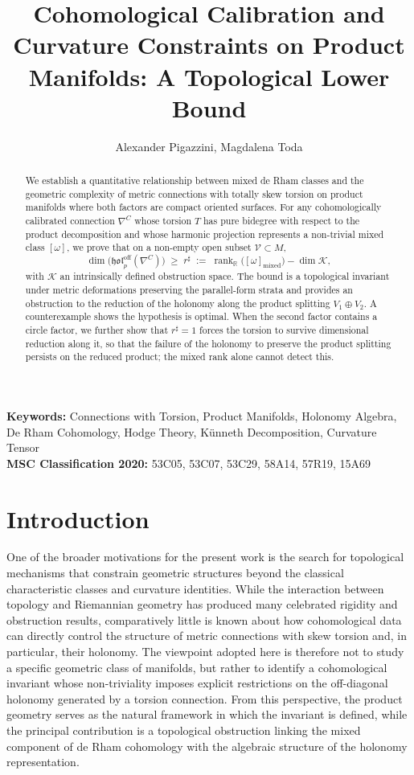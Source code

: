 \documentclass[11pt,reqno]{amsart}
\title[Cohomological Calibration and Curvature Constraints]{Cohomological Calibration and Curvature Constraints on Product Manifolds: A Topological Lower Bound}
\author{Alexander Pigazzini, Magdalena Toda}
\date{}
\theoremstyle{plain}
\theoremstyle{definition}
\numberwithin{equation}{section}
\begin{document}
\begin{abstract}

We establish a quantitative relationship between mixed de Rham classes and the geometric complexity of metric connections with totally skew torsion on product manifolds where both factors are compact oriented surfaces. For any cohomologically calibrated connection $\nabla^C$ whose torsion $T$ has pure bidegree with respect to the product decomposition and whose harmonic projection represents a non-trivial mixed class $[\omega]$, we prove that on a non-empty open subset $\mathcal{V} \subset M$,
\[
\dim\bigl(\mathfrak{hol}_p^{\mathrm{off}}(\nabla^{C})\bigr)\;\geq\;
r^\sharp\;:=\;\operatorname{rank}_{\mathbb{R}}\bigl([\omega]_{\mathrm{mixed}}\bigr)-\dim\mathcal{K},
\]
with $\mathcal{K}$ an intrinsically defined obstruction space.  The bound is a topological invariant under metric deformations preserving the parallel‑form strata and provides an obstruction to the reduction of the holonomy along the product splitting $V_1\oplus V_2$. A counterexample shows the hypothesis is optimal. When the second factor contains a circle factor, we further show that $r^{\sharp}=1$ forces the torsion to survive dimensional reduction along it, so
that the failure of the holonomy to preserve the product splitting persists on the reduced product; the mixed rank alone cannot detect this.

\end{abstract}


\maketitle
\textbf{Keywords:} Connections with Torsion, Product Manifolds, Holonomy Algebra, De Rham Cohomology, Hodge Theory, Künneth Decomposition, Curvature Tensor
\\
\textbf{MSC Classification 2020:} 53C05, 53C07, 53C29, 58A14, 57R19, 15A69

\section{Introduction}
\label{sec_1}

One of the broader motivations for the present work is the search for topological mechanisms that constrain geometric structures beyond the classical characteristic classes and curvature identities.  While the interaction between topology and Riemannian geometry has produced many celebrated rigidity and obstruction results, comparatively little is known
about how cohomological data can directly control the structure of metric connections with skew torsion and, in particular, their holonomy.  The viewpoint adopted here is therefore not to study a specific geometric class
of manifolds, but rather to identify a cohomological invariant whose non-triviality imposes explicit restrictions on the off-diagonal holonomy generated by a torsion connection.  From this perspective, the product geometry serves as the natural framework in which the invariant is defined, while the principal contribution is a topological obstruction linking the
mixed component of de Rham cohomology with the algebraic structure of the holonomy representation.
\end{document}
